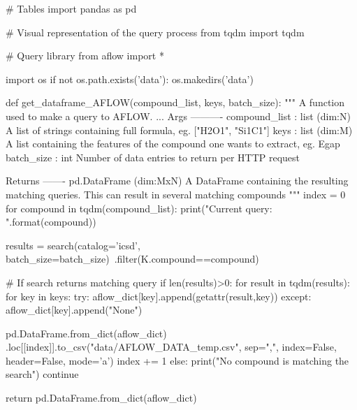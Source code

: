 # Tables
import pandas as pd

# Visual representation of the query process
from tqdm import tqdm

# Query library
from aflow import *

import os
if not os.path.exists('data'):
    os.makedirs('data')

def get_dataframe_AFLOW(compound_list, keys, batch_size):
    """
    A function used to make a query to AFLOW.
    ...
    Args
    ----------
    compound_list : list (dim:N)
        A list of strings containing full formula, eg. ["H2O1", "Si1C1"]
    keys : list (dim:M)
        A list containing the features of the compound one wants to extract,
        eg. Egap
    batch_size : int
        Number of data entries to return per HTTP request

    Returns
    -------
    pd.DataFrame (dim:MxN)
        A DataFrame containing the resulting matching queries. This can result
        in several matching compounds
    """
    index = 0
    for compound in tqdm(compound_list):
        print("Current query: {}".format(compound))

        results = search(catalog='icsd', batch_size=batch_size)\
            .filter(K.compound==compound)

        # If search returns matching query
        if len(results)>0:
            for result in tqdm(results):
                for key in keys:
                    try:
                        aflow_dict[key].append(getattr(result,key))
                    except:
                        aflow_dict[key].append("None")

                pd.DataFrame.from_dict(aflow_dict)
                  .loc[[index]].to_csv("data/AFLOW_DATA_temp.csv",
                sep=",",
                index=False,
                header=False,
                mode='a')
                index += 1
        else:
            print("No compound is matching the search")
            continue

    return pd.DataFrame.from_dict(aflow_dict)
